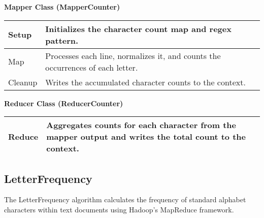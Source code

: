 \textbf{Mapper Class (MapperCounter)}
\begin{longtable}{|>{\raggedright\arraybackslash}p{}|>{\raggedright\arraybackslash}p{}|}
    \hline
    Setup &  Initializes the character count map and regex pattern.\\
    \hline
    Map &  Processes each line, normalizes it, and counts the occurrences of each letter.\\
    \hline
    Cleanup &Writes the accumulated character counts to the context.\\
    \hline
\end{longtable}



\textbf{Reducer Class (ReducerCounter)}
\begin{longtable}{|>{\raggedright\arraybackslash}p{}|>{\raggedright\arraybackslash}p{}|}
    \hline
    Reduce & Aggregates counts for each character from the mapper output and writes the total count to the context. \\
    \hline
\end{longtable}



\subsection{LetterFrequency}

The LetterFrequency algorithm calculates the frequency of standard alphabet characters within text documents using Hadoop's MapReduce framework.\\




